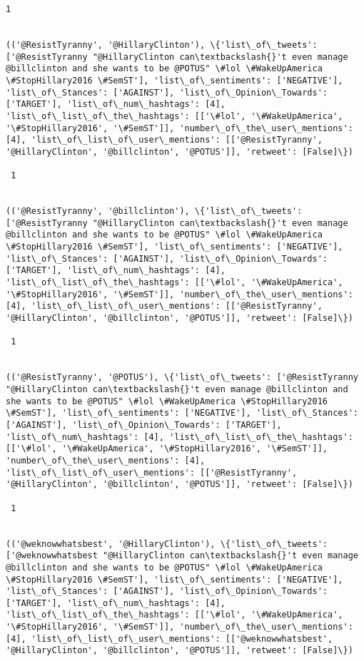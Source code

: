 \documentclass[11pt]{article}
\begin{document}
\begin{Verbatim}[commandchars=\\\{\}]
 1
 

(('@ResistTyranny', '@HillaryClinton'), \{'list\_of\_tweets': ['@ResistTyranny "@HillaryClinton can\textbackslash{}'t even manage @billclinton and she wants to be @POTUS" \#lol \#WakeUpAmerica \#StopHillary2016 \#SemST'], 'list\_of\_sentiments': ['NEGATIVE'], 'list\_of\_Stances': ['AGAINST'], 'list\_of\_Opinion\_Towards': ['TARGET'], 'list\_of\_num\_hashtags': [4], 'list\_of\_list\_of\_the\_hashtags': [['\#lol', '\#WakeUpAmerica', '\#StopHillary2016', '\#SemST']], 'number\_of\_the\_user\_mentions': [4], 'list\_of\_list\_of\_user\_mentions': [['@ResistTyranny', '@HillaryClinton', '@billclinton', '@POTUS']], 'retweet': [False]\})

 1
 

(('@ResistTyranny', '@billclinton'), \{'list\_of\_tweets': ['@ResistTyranny "@HillaryClinton can\textbackslash{}'t even manage @billclinton and she wants to be @POTUS" \#lol \#WakeUpAmerica \#StopHillary2016 \#SemST'], 'list\_of\_sentiments': ['NEGATIVE'], 'list\_of\_Stances': ['AGAINST'], 'list\_of\_Opinion\_Towards': ['TARGET'], 'list\_of\_num\_hashtags': [4], 'list\_of\_list\_of\_the\_hashtags': [['\#lol', '\#WakeUpAmerica', '\#StopHillary2016', '\#SemST']], 'number\_of\_the\_user\_mentions': [4], 'list\_of\_list\_of\_user\_mentions': [['@ResistTyranny', '@HillaryClinton', '@billclinton', '@POTUS']], 'retweet': [False]\})

 1
 

(('@ResistTyranny', '@POTUS'), \{'list\_of\_tweets': ['@ResistTyranny "@HillaryClinton can\textbackslash{}'t even manage @billclinton and she wants to be @POTUS" \#lol \#WakeUpAmerica \#StopHillary2016 \#SemST'], 'list\_of\_sentiments': ['NEGATIVE'], 'list\_of\_Stances': ['AGAINST'], 'list\_of\_Opinion\_Towards': ['TARGET'], 'list\_of\_num\_hashtags': [4], 'list\_of\_list\_of\_the\_hashtags': [['\#lol', '\#WakeUpAmerica', '\#StopHillary2016', '\#SemST']], 'number\_of\_the\_user\_mentions': [4], 'list\_of\_list\_of\_user\_mentions': [['@ResistTyranny', '@HillaryClinton', '@billclinton', '@POTUS']], 'retweet': [False]\})

 1
 

(('@weknowwhatsbest', '@HillaryClinton'), \{'list\_of\_tweets': ['@weknowwhatsbest "@HillaryClinton can\textbackslash{}'t even manage @billclinton and she wants to be @POTUS" \#lol \#WakeUpAmerica \#StopHillary2016 \#SemST'], 'list\_of\_sentiments': ['NEGATIVE'], 'list\_of\_Stances': ['AGAINST'], 'list\_of\_Opinion\_Towards': ['TARGET'], 'list\_of\_num\_hashtags': [4], 'list\_of\_list\_of\_the\_hashtags': [['\#lol', '\#WakeUpAmerica', '\#StopHillary2016', '\#SemST']], 'number\_of\_the\_user\_mentions': [4], 'list\_of\_list\_of\_user\_mentions': [['@weknowwhatsbest', '@HillaryClinton', '@billclinton', '@POTUS']], 'retweet': [False]\})


\end{Verbatim}
\end{document}

